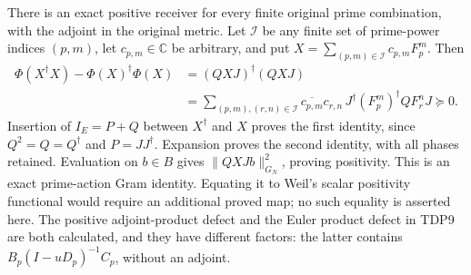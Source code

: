 \documentclass[11pt]{article}
\begin{document}
There is an exact positive receiver for every finite original prime
combination, with the adjoint in the original metric. Let $\mathcal I$
be any finite set of prime-power indices $(p,m)$, let $c_{p,m}\in\mathbb C$
be arbitrary, and put $X=\sum_{(p,m)\in\mathcal I}c_{p,m}F_p^m$. Then
\begin{equation}\tag{TDP28}
\begin{aligned}
\Phi(X^\dagger X)-\Phi(X)^\dagger\Phi(X)
 &=(QXJ)^\dagger(QXJ)\\
 &=\sum_{(p,m),(r,n)\in\mathcal I}
 \overline{c_{p,m}}c_{r,n}\,
 J^\dagger(F_p^m)^\dagger QF_r^nJ\succeq0.
\end{aligned}
\end{equation}
Insertion of $I_E=P+Q$ between $X^\dagger$ and $X$ proves the first
identity, since $Q^2=Q=Q^\dagger$ and $P=JJ^\dagger$. Expansion proves
the second identity, with all phases retained. Evaluation on $b\in B$
gives $\|QXJb\|_{G_N}^2$, proving positivity. This is an exact
prime-action Gram identity. Equating it to Weil's scalar positivity
functional would require an additional proved map; no such equality is
asserted here. The positive adjoint-product defect and the Euler
product defect in TDP9 are both calculated, and they have different
factors: the latter contains $B_p(I-uD_p)^{-1}C_p$, without an adjoint.
\end{document}
